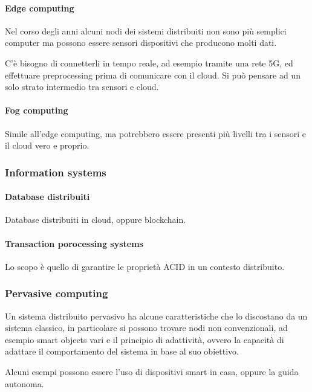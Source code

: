 \paragraph{Edge computing}
Nel corso degli anni alcuni nodi dei sistemi distribuiti non sono più 
semplici computer ma possono essere sensori dispositivi che 
producono molti dati.

C'è bisogno di connetterli in tempo reale, ad esempio tramite una rete 5G, ed effettuare 
preprocessing prima di comunicare con il cloud.
Si può pensare ad un solo strato intermedio tra sensori e cloud.

\paragraph{Fog computing}
Simile all'edge computing, ma potrebbero essere presenti più livelli tra i sensori 
e il cloud vero e proprio.

\subsubsection{Information systems}

\paragraph{Database distribuiti}
Database distribuiti in cloud, oppure blockchain.

\paragraph{Transaction porocessing systems}
Lo scopo è quello di garantire le proprietà ACID in un contesto distribuito.

\subsubsection{Pervasive computing}

Un sistema distribuito pervasivo ha alcune caratteristiche che 
lo discostano da un sistema classico, in particolare si possono trovare 
nodi non convenzionali, ad esempio smart objects vari e il principio 
di adattività, ovvero la capacità di adattare il comportamento del sistema
in base al suo obiettivo.

Alcuni esempi possono essere l'uso di dispositivi smart in casa, oppure 
la guida autonoma.
